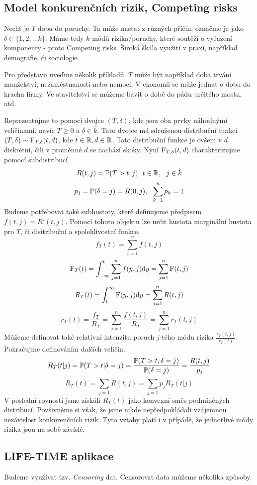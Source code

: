 \subsection{Model konkurenčních rizik, Competing risks}
Nechť je $T$ doba do poruchy. Ta může nastat z různých příčin, označme je jako $\delta \in \lbrace1,2,\dots k \rbrace$. Máme tedy $k$ módů rizika/poruchy, které soutěží o vyřazení komponenty - proto Competing risks. Široká škála využití v praxi, například demografie, či sociologie. 
\begin{example}
	Pro představu uveďme několik příkladů. $T$ může být například doba trvání manželství, nezaměstnanosti nebo nemoci. V ekonomii se může jednat o dobu do krachu firmy. Ve stavitelství se můžeme bavit o době do pádu určitého mostu, atd.	
\end{example}
Reprezentujme to pomocí dvojce $(T, \delta)$, kde jsou oba prvky náhodnými veličinami, navíc $T \geq 0$ a $\delta\in\hat{k}$. Tato dvojce má sdruženou distribuční funkci $(T, \delta) \sim \mathrm{F}_{T,\delta}(t,d)$, kde $t\in\mathbb{R}, d\in \mathbb{R}$. Tato distribuční funkce je ovšem v $d$ diskrétní, čili v proměnné $d$ se nachází skoky. Nyní $\mathrm{F}_{T,\delta}(t,d)$ charakterizujme pomocí subdistribucí.
$$R(t,j) = \mathbb{P}(T > t, j)~~t \in \mathbb{R}, ~~j \in \hat{k}$$ 
$$p_j = \mathbb{P}(\delta = j) = R(0,j), ~~\sum_{k=1}^n p_k = 1$$ 
Budeme potřebovat také subhustoty, které definujeme předpisem $f(t,j)=R'(t,j)$. Pomocí tohoto objektu lze určit hustota marginální hustota pro $T$, či disitribuční a spolehlivostní funkce.
$$f_T(t) = \sum_{i = 1}^{n}f(t,j)$$
$$\mathrm{F}_T(t) = \int_{-\infty}^{t} \sum_{j=1}^n f(y,j)\mathrm{d} y = \sum_{j=1}^n \mathrm{F}(t,j)  $$
$$R_T(t) = \int_{t}^{\infty} \mathrm{F}(y,j) \mathrm{d} y = \sum_{j=1}^n R(t,j) $$
$$r_T(t) = \frac{f_T}{R_T} = \sum_{j=1}^n\frac{f(t,j)}{R_T} = \sum_{j=1}^n r_T(t,j) $$
Můžeme definovat také relativní intenzitu poruch $j$-tého módu rizika $\frac{r_T(t,j)}{r_T(t)}$.
Pokračujme definováním dalších veličin.
$$ R_T(t|j) = \mathbb{P}(T > t|\delta =j) = \frac{\mathbb{P}(T > t, \delta =j)}{\mathbb{P}(\delta =j)} = \frac{R(t,j)}{p_j} $$
$$R_T(t) = \sum_{j=1}R(t,j) = \sum_{j=1}p_j R_T(t|j)$$
V poslední rovnosti jsme získáli $R_T(t)$ jako konvexní směs podmíněných distribucí. Povšivněme si však, že jsme nikde nepředpokládali vzájemnou nezávislost konkurenčních rizik. Tyto vztahy platí i v přípádě, že jednotlivé módy rizika jsou na sobě závíslé.
\subsection{LIFE-TIME aplikace}
Budeme využívat tzv. \emph{Censoring} dat. Censorovat data můžeme několika způsoby.

